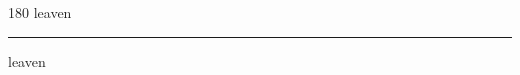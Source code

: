 
\begin{frame}
\begin{center}
\begin{turn}{180}
{\fontsize{2.5cm}{1em}\selectfont leaven}
\end{turn}
\vspace{1em}\par  
\hrule
\vspace{1em}\par  
{\fontsize{2.5cm}{1em}\selectfont leaven}
\end{center}
\end{frame}

